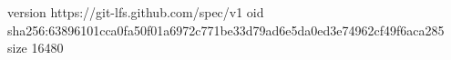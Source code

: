 version https://git-lfs.github.com/spec/v1
oid sha256:63896101cca0fa50f01a6972c771be33d79ad6e5da0ed3e74962cf49f6aca285
size 16480
